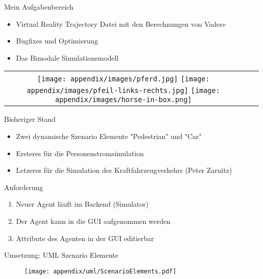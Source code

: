 \begin{frame}{Mein Aufgabenbereich}
	\begin{itemize}
		\item Virtual Reality Trajectory Datei mit den Berechnungen von Vadere
		\item Bugfixes und Optimierung
		\item Das Bimodale Simulationsmodell
	\end{itemize}

	\begin{tabular}{ccc}
		\texttt{[image: appendix/images/pferd.jpg]}
		\texttt{[image: appendix/images/pfeil-links-rechts.jpg]}
		\hspace{0.7em}
		\texttt{[image: appendix/images/horse-in-box.png]}
	\end{tabular}

\end{frame}

\begin{frame}{Bisheriger Stand}
	\begin{itemize}
		\item Zwei dynamische Szenario Elemente "Pedestrian" und "Car"
		\item Ersteres für die Personenstromsimulation
		\item Letzeres für die Simulation des Kraftfahrzeugverkehrs (Peter Zarnitz) \cite{zarnitz-2015}
	\end{itemize}
\end{frame}

\begin{frame}{Anforderung}
	\begin{enumerate}
		\item Neuer Agent läuft im Backend (Simulator)
		\item Der Agent kann in die GUI aufgenommen werden
		\item Attribute des Agenten in der GUI editierbar
	\end{enumerate}
\end{frame}

\begin{frame}{Umsetzung: UML Szenario Elemente}
	\begin{figure}
		\texttt{[image: appendix/uml/ScenarioElements.pdf]}
	\end{figure}
\end{frame}


